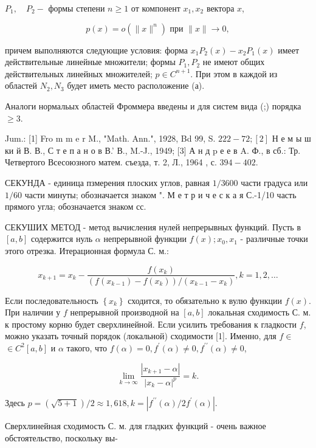 \documentclass[10pt]{article}
\begin{document}
$P_{1}, \quad P_{2}-$ формы степени $n \geqslant 1$ от компонент $x_{1}, x_{2}$ вектора $x$,



\[

p(x)=o\left(\|x\|^{n}\right) \text { при }\|x\| \rightarrow 0,

\]



причем выполняются следующие условия: форма $x_{1} P_{2}(x)-x_{2} P_{1}(x)$ имеет действительные линейные множители; формы $P_{1}, P_{2}$ не имеют общих действительных линейных множителей; $p \in C^{n+1}$. При этом в каждой из областей $N_{2}, N_{3}$ будет иметь место расположение (а).



Аналоги нормальых областей Фроммера введены и для систем вида (;) порядка $\geqslant 3$.



Jum.: [1] Fro m m e r M., "Math. Ann.", 1928, Bd 99, S. $222-72 ;[2]$ Н е м ы ш ки й В. В., С т е п а н о в В.' В., M.-J., 1949; [3] А н д p е е в A. Ф., в сб.: Тр. Четвертого Всесоюзного матем. съезда, т. 2, Л., 1964 , с. $394-402$.



СЕКУНДА - единица пзмерения плоских углов, равная $1 / 3600$ части градуса или $1 / 60$ части минуты; обозначается знаком ". М е т р и ч е с к а я С.-1/10 часть прямого угла; обозначается знаком сс.



СЕКУШИХ МЕТОД - метод вычисления нулей непрерывных функций. Пусть в $[a, b]$ содержится нуль $\alpha$ непрерывной функции $f(x) ; x_{0}, x_{1}$ - различные точки этого отрезка. Итерационная формула С. м.:



\[

x_{k+1}=x_{k}-\frac{f\left(x_{k}\right)}{\left(f\left(x_{k-1}\right)-f\left(x_{k}\right)\right) /\left(x_{k-1}-x_{k}\right)}, k=1,2, \ldots

\]



Если последовательность $\left\{x_{k}\right\}$ сходится, то обязательно к вулю функции $f(x)$. При наличии у $f$ непрерывной производной на $[a, b]$ локальная сходимость С. м. к простому корню будет сверхлинейной. Если усилить требования к гладкости $f$, можно указать точный порядок (локальной) сходимости [1]. Именно, для $f \in$ $\in C^{2}[a, b]$ и $\alpha$ такого, что $f(\alpha)=0, f^{\prime}(\alpha) \neq 0, f^{\prime \prime}(\alpha) \neq 0$,



\[

\lim _{k \rightarrow \infty} \frac{\left|x_{k+1}-\alpha\right|}{\left|x_{k}-\alpha\right|^{p}}=k .

\]



Здесь $p=(\sqrt{5+1}) / 2 \approx 1,618, k=\left|f^{\prime \prime}(\alpha) / 2 f^{\prime}(\alpha)\right|$.



Сверхлинейная сходимость С. м. для гладких функций - очень важное обстоятельство, поскольку вы-
\end{document}
